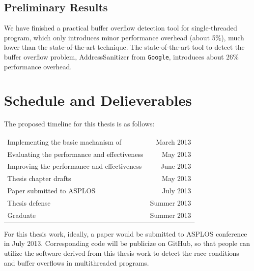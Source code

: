 \subsection{Preliminary Results}
We have finished a practical buffer overflow detection tool for single-threaded program, which only
introduces minor performance overhead (about 5\%), much lower than the state-of-the-art technique.
The state-of-the-art tool to detect the buffer overflow problem,
AddressSanitizer from \texttt{Google}, introduces about 26\% performance overhead.

\section{Schedule and Delieverables}

The proposed timeline for this thesis is as follows:

\begin{table}[ht]
\centering
\begin{tabular}{ l r}
Implementing the basic machanism of \DoubleTake{} & March 2013 \\ 
Evaluating the performance and effectiveness & May 2013 \\
Improving the performance and effectiveness & June 2013 \\
Thesis chapter drafts & May 2013 \\ 
Paper submitted to ASPLOS & July 2013 \\
Thesis defense  & Summer 2013\\
Graduate & Summer 2013 \\
\end{tabular}
{\label{table:timeline}}
\end{table}

For this thesis work, ideally, a paper would be submitted to ASPLOS conference in July 2013. 
Corresponding code will be publicize on GitHub, so that people can utilize the software
derived from this thesis work
to detect the race conditions and buffer overflows in multithreaded programs.
